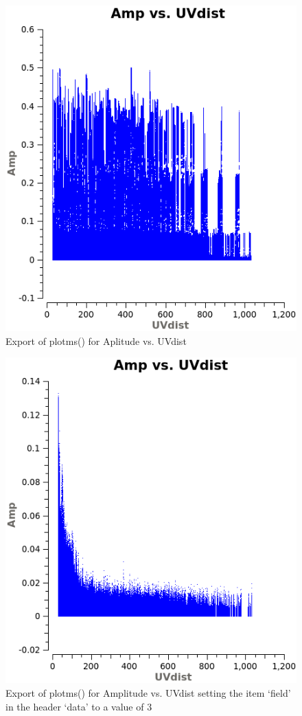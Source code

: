 \documentclass[12pt, a4paper]{article}
\begin{document}
\begin{figure}[h!]
    \centering
    \includegraphics[scale=0.65]{../Imaging/plots/Ampltide_vs_UVdist_vraag14-4.png}
    \caption{Export of plotms() for Aplitude vs. UVdist \label{fig:14-4}}
\end{figure}


\begin{figure}[h!]
    \centering
    \includegraphics[scale=0.65]{../Imaging/plots/Ampltide_vs_UVdist_data-field-3_vraag14-5.png}
    \caption{Export of plotms() for Amplitude vs. UVdist setting the item `field' in the header `data' to a value of 3 \label{fig:14-5}}
\end{figure}
\end{document}
